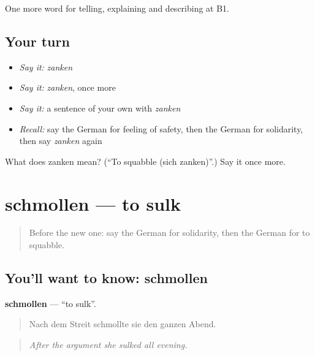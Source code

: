 \begin{grammarlens}[title={What you've built}]
One more word for telling, explaining and describing at B1.
\end{grammarlens}

\subsection*{Your turn}
\begin{itemize}
\raggedright
  \item \emph{Say it:} \emph{zanken}
  \item \emph{Say it:} \emph{zanken}, once more
  \item \emph{Say it:} a sentence of your own with \emph{zanken}
  \item \emph{Recall:} say the German for feeling of safety, then the German for solidarity, then say \emph{zanken} again
\end{itemize}

\begin{tcolorbox}[breakable,colback=teal!4,colframe=teal!35!black,title={Before you move on}]
What does zanken mean? (\textquotedblleft{}To squabble (sich zanken)\textquotedblright{}.) Say it once more.
\end{tcolorbox}
\section[schmollen]{schmollen — to sulk}

\label{lesson:GE-C494-schmollen}



\begin{quote}
Before the new one: say the German for solidarity, then the German for to squabble.
\end{quote}

\subsection*{You'll want to know: schmollen}
\textbf{schmollen} — \textquotedblleft{}to sulk\textquotedblright{}.

\begin{quote}
Nach dem Streit schmollte sie den ganzen Abend.
\end{quote}

\begin{quote}
\emph{After the argument she sulked all evening.}
\end{quote}


